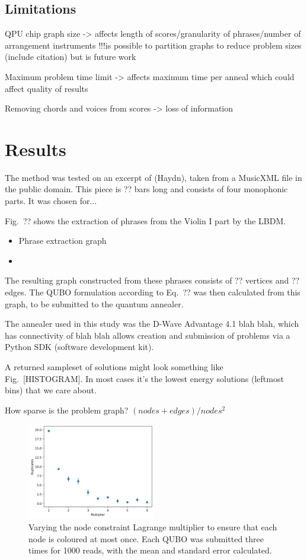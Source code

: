 \documentclass[12pt]{article}
\theoremstyle{definition}
\begin{document}
\subsection{Limitations}

QPU chip graph size -> affects length of scores/granularity of phrases/number of arrangement instruments
!!!is possible to partition graphs to reduce problem sizes (include citation) but is future work

Maximum problem time limit -> affects maximum time per anneal which could affect quality of results

Removing chords and voices from scores -> loss of information

\section{Results}

The method was tested on an excerpt of (Haydn), taken from a MusicXML file in the public domain. This piece is ?? bars long and consists of four monophonic parts. It was chosen for...

Fig.\ ?? shows the extraction of phrases from the Violin I part by the LBDM.

\begin{itemize}
    \item Phrase extraction graph
    \item 
\end{itemize}

The resulting graph constructed from these phrases consists of ?? vertices and ?? edges. The QUBO formulation according to Eq.\ ?? was then calculated from this graph, to be submitted to the quantum annealer.

The annealer used in this study was the D-Wave Advantage 4.1 blah blah, which has connectivity of blah blah allows creation and submission of problems via a Python SDK (software development kit).

A returned sampleset of solutions might look something like Fig.\ [HISTOGRAM]. In most cases it's the lowest energy solutions (leftmost bins) that we care about.

How sparse is the problem graph? $(nodes + edges)/nodes^2$

\begin{figure}
    \includegraphics[width=0.5\textwidth]{node-constraint.png}
    \caption{Varying the node constraint Lagrange multiplier to ensure that each node is coloured at most once. Each QUBO was submitted three times for 1000 reads, with the mean and standard error calculated.}
\end{figure}
\end{document}
